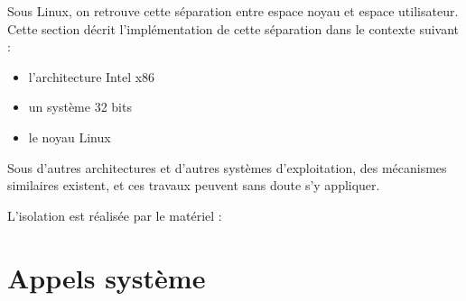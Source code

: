 Sous Linux, on retrouve cette séparation entre espace noyau et espace
utilisateur. Cette section décrit l'implémentation de cette séparation dans le
contexte suivant :

\begin{itemize}
\item l'architecture Intel x86
\item un système 32 bits
\item le noyau Linux
\end{itemize}

Sous d'autres architectures et d'autres systèmes d'exploitation, des mécanismes
similaires existent, et ces travaux peuvent sans doute s'y appliquer.

L'isolation est réalisée par le matériel :

\section{Appels système}
